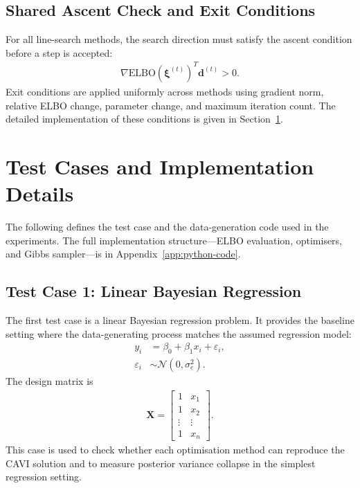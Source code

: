 \documentclass[11pt,a4paper]{article}
\newcommand{\N}{\mathcal{N}}
\newcommand{\ELBO}{\text{ELBO}}
\begin{document}
\subsection{Shared Ascent Check and Exit Conditions}

For all line-search methods, the search direction must satisfy the ascent condition before a step is accepted:
\begin{align}
\nabla\ELBO(\bm{\xi}^{(t)})^T\bm{d}^{(t)} > 0.
\end{align}
Exit conditions are applied uniformly across methods using gradient norm, relative ELBO change, parameter change, and maximum iteration count. The detailed implementation of these conditions is given in Section~\ref{sec:implementation-details}.

\section{Test Cases and Implementation Details}
\label{sec:implementation-details}

The following defines the test case and the data-generation code used in the experiments. The full implementation structure---ELBO evaluation, optimisers, and Gibbs sampler---is in Appendix~\ref{app:python-code}.

\subsection{Test Case 1: Linear Bayesian Regression}

The first test case is a linear Bayesian regression problem. It provides the baseline setting where the data-generating process matches the assumed regression model:
\begin{align}
y_i &= \beta_0 + \beta_1 x_i + \varepsilon_i,\\
\varepsilon_i &\sim \N(0,\sigma_e^2).
\end{align}
The design matrix is
\begin{align}
\bm{X} =
\begin{bmatrix}
1 & x_1\\
1 & x_2\\
\vdots & \vdots\\
1 & x_n
\end{bmatrix}.
\end{align}
This case is used to check whether each optimisation method can reproduce the CAVI solution and to measure posterior variance collapse in the simplest regression setting.
\end{document}
